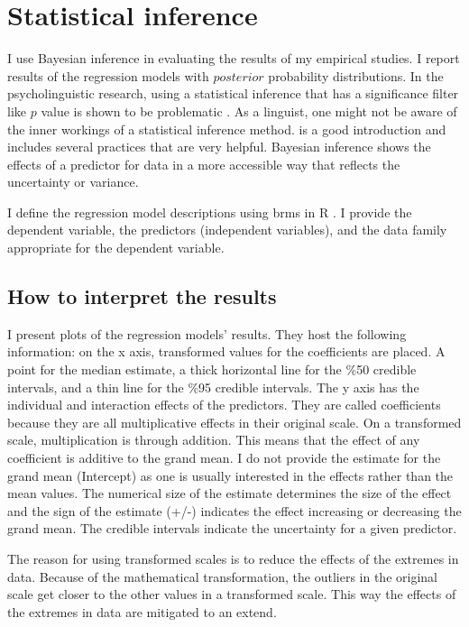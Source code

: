 \section{Statistical inference}

I use Bayesian inference in evaluating the results of my empirical studies. I report results of the regression models with $posterior$ probability distributions. In the psycholinguistic research, using a statistical inference that has a significance filter like $p$ value is shown to be problematic \citep{vasishth2018statistical, wagenmakers2007practical,kruschke2011bayesian}. As a linguist, one might not be aware of the inner workings of a statistical inference method. \cite{mcelreath2020statistical} is a good introduction and includes several practices that are very helpful. Bayesian inference shows the effects of a predictor for data in a more accessible way that reflects the uncertainty or variance. 

I define the regression model descriptions using brms \citep{burkner2017brms} in R \citep{team2013r}. I provide the dependent variable, the predictors (independent variables), and the data family appropriate for the dependent variable. 

\subsection{How to interpret the results}

I present plots of the regression models' results. They host the following information: on the x axis, transformed values for the coefficients are placed. A point for the median estimate, a thick horizontal line for the \%50 credible intervals, and a thin line for the \%95 credible intervals. The y axis has the individual and interaction effects of the predictors. They are called coefficients because they are all multiplicative effects in their original scale. On a transformed scale, multiplication is through addition. This means that the effect of any coefficient is additive to the grand mean. I do not provide the estimate for the grand mean (Intercept) as one is usually interested in the effects rather than the mean values. The numerical size of the estimate determines the size of the effect and the sign of the estimate (+/-) indicates the effect increasing or decreasing the grand mean. The credible intervals indicate the uncertainty for a given predictor.

The reason for using transformed scales is to reduce the effects of the extremes in data. Because of the mathematical transformation, the outliers in the original scale get closer to the other values in a transformed scale. This way the effects of the extremes in data are mitigated to an extend.

